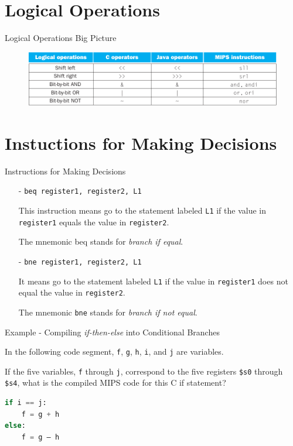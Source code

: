 \section{Logical Operations}
\begin{frame}{Logical Operations Big Picture}
\begin{figure}
\begin{center}
\includegraphics[width=\textwidth, height=0.4\textheight]{docs/images/logical}
\end{center}
\end{figure}
\end{frame}

\section{Instuctions for Making Decisions}
\begin{frame}{Instructions for Making Decisions}
\begin{itemize}
\item[-]
\texttt{beq register1, register2, L1}

This instruction means go to the statement labeled \texttt{L1} if the value in \texttt{register1}
equals the value in \texttt{register2}.

The mnemonic beq stands for \textit{branch if equal}.

\vspace{5mm}
\item[-]
\texttt{bne register1, register2, L1}

It means go to the statement labeled \texttt{L1} if the value in \texttt{register1} does not equal
the value in \texttt{register2}.

The mnemonic \texttt{bne} stands for \textit{branch if not equal}.
\end{itemize}
\end{frame}

\begin{frame}[fragile]{Example - Compiling \textit{if-then-else} into Conditional Branches}
\begin{flushleft}
In the following code segment, \texttt{f}, \texttt{g}, \texttt{h}, \texttt{i}, and \texttt{j} are variables. 

If the five variables, \texttt{f} through \texttt{j}, correspond to the five registers \texttt{\$s0} through \texttt{\$s4}, what is the
compiled MIPS code for this C if statement?

\begin{lstlisting}[language=python, keywordstyle=\color{purple}\textbf]
if i == j:
    f = g + h
else:
    f = g – h
\end{lstlisting}
\end{flushleft}
\end{frame}


